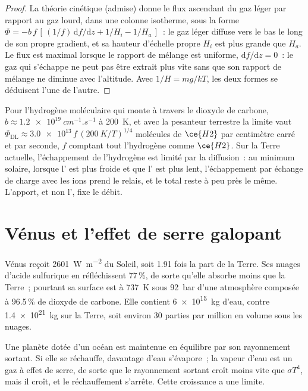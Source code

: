 \begin{proof}
La théorie cinétique (admise) donne le flux ascendant du gaz léger
par rapport au gaz lourd, dans une colonne isotherme, sous la forme $\Phi = -b\,f\,
[\,(1/f)\,\mathrm df/\mathrm dz + 1/H_i - 1/H_a\,]$~: le gaz léger diffuse vers le bas le long de son propre gradient, et sa
hauteur d'échelle propre $H_i$ est plus grande que $H_a$. Le flux est maximal lorsque le
rapport de mélange est uniforme, $\mathrm
df/\mathrm dz = 0$~: le gaz qui s'échappe ne peut pas être extrait plus vite sans que son
rapport de mélange ne diminue avec l'altitude. Avec $1/H = mg/kT$, les deux formes
se déduisent l'une de l'autre.
\end{proof}

Pour l'hydrogène moléculaire qui monte à travers le dioxyde de carbone, $b \approx
\qty{1.2e19}{cm^{-1}.s^{-1}}$ à \qty{200}{K}, et avec la pesanteur terrestre
la limite vaut $\Phi_\mathrm{DL} \approx
\num{3.0e13}\,f\,(\qty{200}{K}/T)^{1/4}$ molécules de $\ce{H2}$ par
centimètre carré et par seconde, $f$ comptant tout l'hydrogène comme $\ce{H2}$. Sur
la Terre actuelle, l'échappement de l'hydrogène est limité par la diffusion~: au minimum solaire,
lorsque l' est plus froide et que l' est plus lent, l'échappement
par échange de charge avec les ions prend le relais, et le total reste à peu près
le même. L'apport, et non
l', fixe le débit.

\section{Vénus et l'effet de serre galopant}\label{sec:b3:planetary-atmospheres:venus}

Vénus reçoit \qty{2601}{W.m^{-2}} du Soleil, soit 1.91 fois la part
de la Terre. Ses nuages d'acide sulfurique en réfléchissent 77\,\%, de sorte qu'elle absorbe
moins que la Terre~; pourtant sa surface est à \qty{737}{K} sous \qty{92}{bar}
d'une atmosphère composée à 96.5\,\% de dioxyde de carbone. Elle contient \qty{6e15}{kg} d'eau,
contre \qty{1.4e21}{kg} sur la Terre, soit environ 30 parties par million en volume
sous les nuages.

Une planète dotée d'un océan est maintenue en équilibre par son rayonnement sortant. Si
elle se réchauffe, davantage d'eau s'évapore~; la vapeur d'eau est un gaz à effet de serre, de sorte que le
rayonnement sortant croît moins vite que $\sigma T^4$, mais il croît, et le
réchauffement s'arrête. Cette croissance a une limite.

